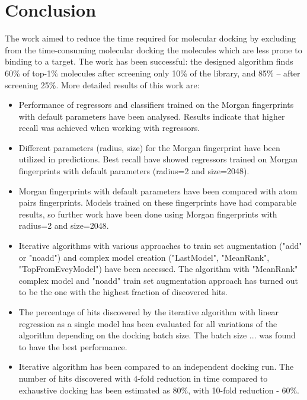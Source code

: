 \chapter{Conclusion}

The work aimed to reduce the time required for molecular docking by excluding from the time-consuming molecular docking
the molecules which are less prone to binding to a target. The work has been successful: the designed algorithm finds 60\% of top-1\% molecules after screening only 10\% of the library, and 85\% -- after screening 25\%.
More detailed results of this work are:

\begin{itemize}
    \item Performance of regressors and classifiers trained on the Morgan fingerprints with default parameters have been analysed.
    Results indicate that higher recall was achieved when working with regressors.
    \item Different parameters (radius, size) for the Morgan fingerprint have been utilized in predictions.
    Best recall have showed regressors trained on Morgan fingerprints with default 
parameters (radius=2 and size=2048).
    \item Morgan fingerprints with default parameters have been compared with atom pairs fingerprints.
    Models trained on these fingerprints have had comparable results, so further 
work have been done using Morgan fingerprints with radius=2 and size=2048.
    \item Iterative algorithms with various approaches to train set augmentation ("add" or "noadd") and complex model creation ("LastModel", "MeanRank", "TopFromEveyModel") have been accessed.
    The algorithm with "MeanRank" complex model and "noadd" train set augmentation 
approach has turned out to be the one with the highest fraction of discovered hits.
    \item The percentage of hits discovered by the iterative algorithm with linear regression as a single model has been evaluated for all variations of the algorithm depending on the docking batch size.
	The batch size ... was found to have the best performance.
    \item Iterative algorithm has been compared to an independent docking run.
    The number of hits discovered with 4-fold reduction in time compared to exhaustive 
docking has been estimated as 80\%, with 10-fold reduction - 60\%.
\end{itemize}
